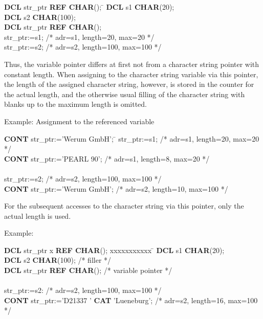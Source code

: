 \begin{tobedone}
\begin{tabbing}
{\bf DCL} str\_ptr \= {\bf REF CHAR}(); \= \kill
{\bf DCL} s1 \> {\bf CHAR}(20); \> \\
{\bf DCL} s2 \> {\bf CHAR}(100); \> \\
{\bf DCL} str\_ptr \> {\bf REF CHAR}(); \> \\
str\_ptr:=s1; \> \> /* adr=s1, length=20, max=20 */ \\
str\_ptr:=s2; \> \> /* adr=s2, length=100, max=100 */
\end{tabbing}

Thus, the variable pointer differs at first not from a character string
pointer with constant length. When assigning to the character string
variable via this pointer, the length of the assigned character string,
however, is stored in the counter for the actual length, and the
otherwise usual filling of the character string with blanks up to the
maximum length is omitted.

Example: Assignment to the referenced variable

\begin{tabbing}
{\bf CONT} str\_ptr:='Werum GmbH'; \= \kill
str\_ptr:=s1; \> /* adr=s1, length=20, max=20 */ \\
{\bf CONT} str\_ptr:='PEARL 90'; \> /* adr=s1, length=8, max=20 */ \\
 \> \\
str\_ptr:=s2; \> /* adr=s2, length=100, max=100 */ \\
{\bf CONT} str\_ptr:='Werum GmbH'; \> /* adr=s2, length=10, max=100 */
\end{tabbing}

For the subsequent accesses to the character string via this pointer,
only the actual length is used.

Example:

\begin{tabbing}
{\bf DCL} str\_ptr x \= {\bf REF CHAR}(); xxxxxxxxxxx \= \kill
{\bf DCL} s1 \> {\bf CHAR}(20); \> \\
{\bf DCL} s2 \> {\bf CHAR}(100); \> /* filler */ \\
{\bf DCL} str\_ptr \> {\bf REF CHAR}(); \> /* variable pointer */       \\
 \> \> \\
str\_ptr:=s2: \> \> /* adr=s2, length=100, max=100 */ \\
{\bf CONT} str\_ptr:='D21337 ' {\bf CAT} 'Lueneburg'; \> \> /* adr=s2, length=16, max=100 */
\end{tabbing}


\end{tobedone}
